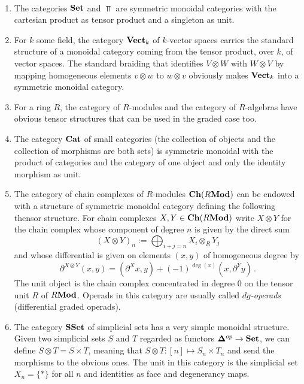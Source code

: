 \documentclass[TFM.tex]{subfiles}
\begin{document}
\begin{ex}\
\begin{enumerate}
\item The categories $\mathrm{\mathbf{Set}}$ and $\Top$ are symmetric monoidal categories with the cartesian product as tensor product and a singleton as unit. 
\item For $k$ some field, the category $\mathrm{\mathbf{Vect}}_k$ of $k$-vector spaces carries the standard structure of a monoidal category coming from the tensor product, over $k$, of vector spaces. The standard braiding that identifies $V\otimes W$ with $W\otimes V$ by mapping homogeneous elements $v\otimes w$ to $w\otimes v$ obviously makes $\mathrm{\mathbf{Vect}}_k$ into a symmetric monoidal category. 

\item For a ring $R$, the category of $R$-modules and the category of $R$-algebras have obvious tensor structures that can be used in the graded case too.

\item The category $\mathrm{\mathbf{Cat}}$ of small categories (the collection of objects and the collection of morphisms are both sets) is symmetric monoidal with the product of categories and the category of one object and only the identity morphism as unit.


\item The category of chain complexes of $R$-modules $\mathrm{\mathbf{Ch}}(R\mathrm{\mathbf{Mod}})$ can be endowed with a structure of symmetric monoidal category defining the following thensor structure. For chain complexes $X,Y\in\mathrm{\mathbf{Ch}}(R\mathrm{\mathbf{Mod}})$ write $X\otimes Y$ for the chain complex whose component of degree $n$ is given by the direct sum
\[
(X \otimes Y)_n := \bigoplus_{i + j = n} X_i \otimes_R Y_j
\]
and whose differential is given on elements $(x,y)$ of homogeneous degree by
\[
\partial^{X \otimes Y} (x, y) = (\partial^X x, y) + 
  (-1)^{\deg(x)} (x, \partial^Y y)
  \,.
\]
The unit object is the chain complex concentrated in degree 0 on the tensor unit $R$ of $R\mathrm{\mathbf{Mod}}$. Operads in this category are usually called \emph{$dg$-operads} (differential graded operads). 

\item The category $\mathrm{\mathbf{SSet}}$ of simplicial sets has a very simple monoidal structure. Given two simplicial sets $S$ and $T$ regarded as functors $\mathbf{\Delta}^{op}\to\mathrm{\mathbf{Set}}$, we can define $S\otimes T=S\times T$, meaning that $S\otimes T:[n]\mapsto S_n\times T_n$ and send the morphisms to the obvious ones. The unit in this category is the simplicial set $X_n=\{*\}$ for all $n$ and identities as face and degenerancy maps. 
\end{enumerate}



\end{ex}
\end{document}
